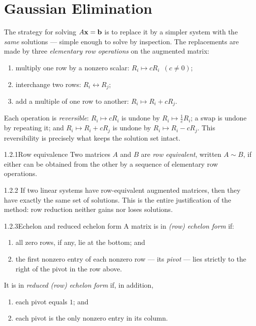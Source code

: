 \section{Gaussian Elimination}
\label{sec:1.2}

The strategy for solving $A\mathbf{x}=\mathbf{b}$ is to replace it by a simpler system with the \emph{same} solutions --- simple enough to solve by inspection. The replacements are made by three \emph{elementary row operations} on the augmented matrix:
\begin{enumerate}[label=\textup{(\alph*)},leftmargin=2.2em,itemsep=1pt]
\item multiply one row by a nonzero scalar: $R_i\mapsto cR_i$\, $(c\neq0)$;
\item interchange two rows: $R_i\leftrightarrow R_j$;
\item add a multiple of one row to another: $R_i\mapsto R_i+cR_j$.
\end{enumerate}
Each operation is \emph{reversible}: $R_i\mapsto cR_i$ is undone by $R_i\mapsto\tfrac1cR_i$; a swap is undone by repeating it; and $R_i\mapsto R_i+cR_j$ is undone by $R_i\mapsto R_i-cR_j$. This reversibility is precisely what keeps the solution set intact.

\begin{defns}{1.2.1}{Row equivalence}
Two matrices $A$ and $B$ are \emph{row equivalent}, written $A\sim B$, if either can be obtained from the other by a sequence of elementary row operations.
\end{defns}

\begin{rmks}{1.2.2}
If two linear systems have row-equivalent augmented matrices, then they have exactly the same set of solutions. This is the entire justification of the method: row reduction neither gains nor loses solutions.
\end{rmks}

\begin{defns}{1.2.3}{Echelon and reduced echelon form}
A matrix is in \emph{(row) echelon form} if:
\begin{enumerate}[label=\arabic*.,leftmargin=2.2em,itemsep=1pt]
\item all zero rows, if any, lie at the bottom; and
\item the first nonzero entry of each nonzero row --- its \emph{pivot} --- lies strictly to the right of the pivot in the row above.
\end{enumerate}
It is in \emph{reduced (row) echelon form} if, in addition,
\begin{enumerate}[label=\arabic*.,leftmargin=2.2em,start=3,itemsep=1pt]
\item each pivot equals $1$; and
\item each pivot is the only nonzero entry in its column.
\end{enumerate}
\end{defns}

